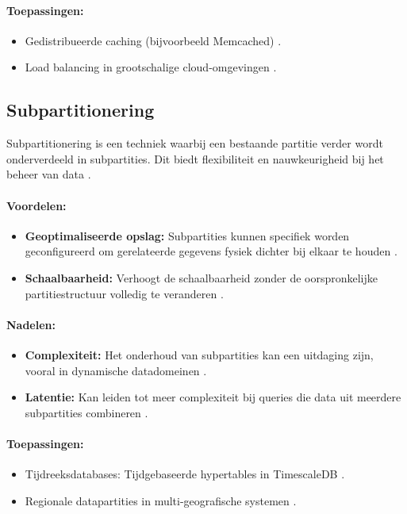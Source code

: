 \paragraph{Toepassingen:}
\begin{itemize}
    \item Gedistribueerde caching (bijvoorbeeld Memcached) \autocite{Kleppmann2017}.
    \item Load balancing in grootschalige cloud-omgevingen \autocite{Kleppmann2017}.
\end{itemize}

\subsection{Subpartitionering}
Subpartitionering is een techniek waarbij een bestaande partitie verder wordt onderverdeeld in subpartities. Dit biedt flexibiliteit en nauwkeurigheid bij het beheer van data \autocite{Mahmud2020}.

\paragraph{Voordelen:}
\begin{itemize}
    \item \textbf{Geoptimaliseerde opslag:} Subpartities kunnen specifiek worden geconfigureerd om gerelateerde gegevens fysiek dichter bij elkaar te houden \autocite{Mahmud2020}.
    \item \textbf{Schaalbaarheid:} Verhoogt de schaalbaarheid zonder de oorspronkelijke partitiestructuur volledig te veranderen \autocite{Mahmud2020}.
\end{itemize}

\paragraph{Nadelen:}
\begin{itemize}
    \item \textbf{Complexiteit:} Het onderhoud van subpartities kan een uitdaging zijn, vooral in dynamische datadomeinen \autocite{Mahmud2020}.
    \item \textbf{Latentie:} Kan leiden tot meer complexiteit bij queries die data uit meerdere subpartities combineren \autocite{Mahmud2020}.
\end{itemize}

\paragraph{Toepassingen:}
\begin{itemize}
    \item Tijdreeksdatabases: Tijdgebaseerde hypertables in TimescaleDB \autocite{Mahmud2020}.
    \item Regionale datapartities in multi-geografische systemen \autocite{Mahmud2020}.
\end{itemize}


